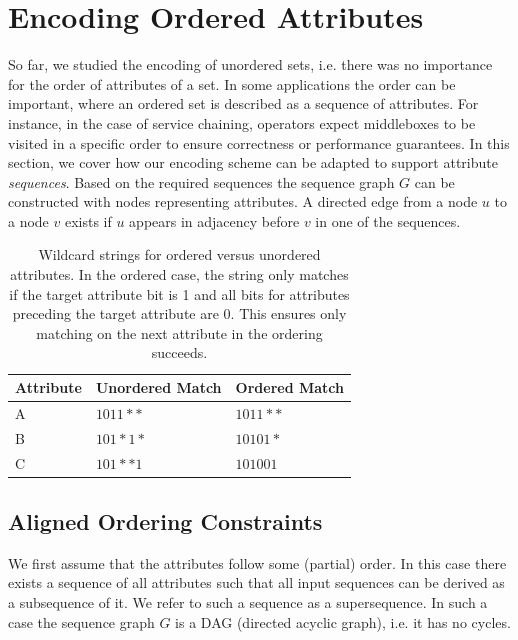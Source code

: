 \section{Encoding Ordered Attributes} 
\label{sec:ordering}
So far, we studied the encoding of unordered sets, i.e. there was no importance for the order of attributes of a set. 
In some applications the order can be important, where an ordered set is described as a sequence of attributes.  For instance, in the case of service chaining, 
operators expect middleboxes to be visited in a specific order to ensure correctness or performance guarantees. 
In this section, we cover how our encoding scheme can be adapted to support attribute \textit{sequences}.
Based on the required sequences the sequence graph $G$ can be constructed with nodes representing attributes. A directed edge from a node $u$ to a node $v$ exists if $u$ appears in adjacency before $v$ in one of the sequences.  

\begin{table}
    \begin{tabular}{| l | l | l |}
    \hline
    Attribute & Unordered Match & Ordered Match\\ \hline
    A & $1011**$ & $1011**$ \\ \hline
    B & $101*1*$ & $10101*$ \\ \hline
    C & $101**1$ & $101001$ \\
    \hline
    \end{tabular}
    \caption{Wildcard strings for ordered versus unordered attributes. %
     In the ordered case, the string only matches if the target attribute bit is 1 and all bits for attributes preceding the target attribute are 0. This ensures only matching on the next attribute in the ordering succeeds.} 
    \label{tab:ordering}
\end{table}

\subsection{Aligned Ordering Constraints}
We first assume that the attributes follow some (partial) order. In this case there exists a sequence of all attributes such that all input sequences can be derived as a subsequence of it. 
We refer to such a sequence as a supersequence. 
In such a case the sequence graph $G$ is a DAG (directed acyclic graph), i.e. it has no cycles.

